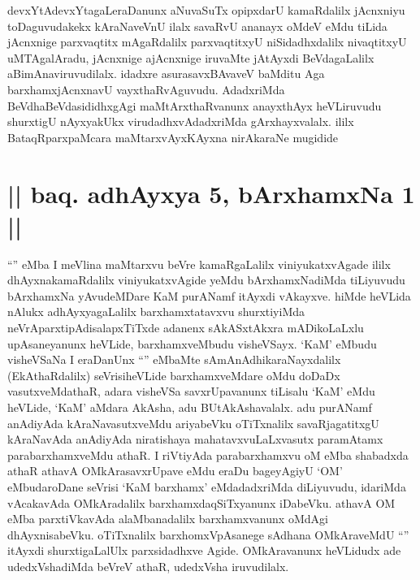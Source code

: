 \begin{artha}
devxYtAdevxYtagaLeraDanunx aNuvaSuTx opipxdarU kamaRdalilx jAcnxniyu toDaguvudakekx kAraNaveVnU ilalx savaRvU ananayx oMdeV eMdu tiLida jAcnxnige parxvaqtitx mAgaRdalilx parxvaqtitxyU niSidadhxdalilx nivaqtitxyU uMTAgalAradu, jAcnxnige ajAcnxnige iruvaMte jAtAyxdi BeVdagaLalilx aBimAnaviruvudilalx. idadxre asurasavxBAvaveV baMditu Aga barxhamxjAcnxnavU vayxthaRvAguvudu. AdadxriMda BeVdhaBeVdasididhxgAgi maMtArxthaRvanunx anayxthAyx heVLiruvudu shurxtigU nAyxyakUkx virudadhxvAdadxriMda gArxhayxvalalx. ililx BataqRparxpaMcara maMtarxvAyxKAyxna nirAkaraNe mugidide
\end{artha}

\section*{|| baq. adhAyxya 5, bArxhamxNa 1 ||}

\begin{artha}
``\stext'' eMba I meVlina maMtarxvu beVre kamaRgaLalilx viniyukatxvAgade ililx dhAyxnakamaRdalilx viniyukatxvAgide yeMdu bArxhamxNadiMda tiLiyuvudu bArxhamxNa yAvudeMDare KaM purANamf itAyxdi vAkayxve. hiMde heVLida nAlukx adhAyxyagaLalilx barxhamxtatavxvu shurxtiyiMda neVrAparxtipAdisalapxTiTxde adanenx sAkASxtAkxra mADikoLaLxlu upAsaneyanunx heVLide, barxhamxveMbudu visheVSayx. `KaM' eMbudu visheVSaNa I eraDanUnx ``\stext'' eMbaMte sAmAnAdhikaraNayxdalilx (EkAthaRdalilx) seVrisiheVLide barxhamxveMdare oMdu doDaDx vasutxveMdathaR, adara visheVSa savxrUpavanunx tiLisalu `KaM' eMdu heVLide, `KaM' aMdara AkAsha, adu BUtAkAshavalalx. adu purANamf anAdiyAda kAraNavasutxveMdu ariyabeVku oTiTxnalilx savaRjagatitxgU kAraNavAda anAdiyAda niratishaya mahatavxvuLaLxvasutx paramAtamx parabarxhamxveMdu athaR. I riVtiyAda parabarxhamxvu oM eMba shabadxda athaR athavA OMkArasavxrUpave eMdu eraDu bageyAgiyU `OM' eMbudaroDane seVrisi `KaM barxhamx' eMdadadxriMda diLiyuvudu, idariMda vAcakavAda OMkAradalilx barxhamxdaqSiTxyanunx iDabeVku. athavA OM eMba parxtiVkavAda alaMbanadalilx barxhamxvanunx oMdAgi dhAyxnisabeVku. oTiTxnalilx barxhomxVpAsanege sAdhana OMkAraveMdU ``\stext'' itAyxdi shurxtigaLalUlx parxsidadhxve Agide. OMkAravanunx heVLidudx ade udedxVshadiMda beVreV athaR, udedxVsha iruvudilalx.
\end{artha}

